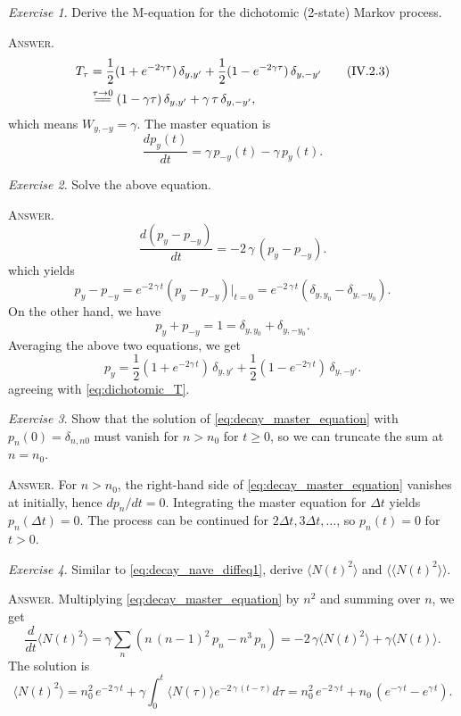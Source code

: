 \documentclass{book}
\numberwithin{equation}{section}
\theoremstyle{plain}
\theoremstyle{definition}
\theoremstyle{remark}
\newtheorem{exercise}{Exercise}
\newcommand{\answer}[1]{{\color{DarkBlue}\footnotesize \textsc{Answer.} #1}}
\begin{document}
\begin{exercise}
  Derive the M-equation for the dichotomic (2-state) Markov process.

  \answer{
  \begin{align}
  T_\tau
  &= \frac{1}{2}(1 + e^{-2\gamma \tau}) \, \delta_{y, y'}
  +\frac{1}{2}(1 - e^{-2\gamma \tau}) \, \delta_{y, -y'}
  \tag{IV.2.3}
  \label{eq:dichotomic_T}
  \\
  &\stackrel{\tau \to 0}{=\joinrel=}
  (1 - \gamma \tau) \, \delta_{y, y'} + \gamma \, \tau \, \delta_{y, -y'},
  \notag
  \end{align}
  which means $W_{y, -y} = \gamma$.
  The master equation is
  $$
  \frac{ d p_y(t) } { dt }
  = \gamma \, p_{-y}(t) - \gamma \, p_y(t).
  $$
  }
\end{exercise}


\begin{exercise}
  Solve the above equation.

  \answer{
  $$
  \frac{ d ( p_y - p_{-y} ) } { dt }
  = -2 \, \gamma \, (p_y - p_{-y} ).
  $$
  which yields
  $$
  p_y - p_{-y} = e^{-2 \, \gamma \, t} (p_y - p_{-y})\big|_{t = 0}
  = e^{-2\, \gamma \, t} (\delta_{y, y_0} - \delta_{y, -y_0}).
  $$
  On the other hand, we have
  $$
  p_y + p_{-y} = 1 = \delta_{y, y_0} + \delta_{y, -y_0}.
  $$
  Averaging the above two equations, we get
  $$
  p_y
  = \frac{1}{2}(1 + e^{-2\gamma \, t}) \, \delta_{y, y'}
  +\frac{1}{2}(1 - e^{-2\gamma \, t}) \, \delta_{y, -y'}.
  $$
  agreeing with \eqref{eq:dichotomic_T}.
  }
\end{exercise}

\begin{exercise}
  Show that the solution of \eqref{eq:decay_master_equation}
  with $p_n(0) = \delta_{n, n0}$
  must vanish for $n > n_0$ for $t \ge 0$,
  so we can truncate the sum at $n = n_0$.

  \answer{
  For $n > n_0$, the right-hand side of \eqref{eq:decay_master_equation}
  vanishes at initially, hence $dp_n/dt = 0$.
  Integrating the master equation for $\Delta t$ yields $p_n(\Delta t) = 0$.
  The process can be continued for $2 \Delta t, 3 \Delta t, \dots$,
  so $p_n(t) = 0$ for $t > 0$.
  }
\end{exercise}

\begin{exercise}
  Similar to \eqref{eq:decay_nave_diffeq1}, derive
  $\langle N(t)^2 \rangle$ and
  $\langle\langle N(t)^2 \rangle\rangle$.

  \answer{
    Multiplying \eqref{eq:decay_master_equation} by $n^2$
    and summing over $n$, we get
    $$
    \frac{ d } { d t } \langle N(t)^2 \rangle
    =
    \gamma \sum_{n} \left( n \, (n-1)^2 \, p_n - n^3 \, p_n \right)
    =
    - 2 \, \gamma \langle N(t)^2 \rangle
    + \gamma \langle N(t) \rangle.
    $$
    The solution is
    $$
    \langle N(t)^2 \rangle
    =
    n_0^2 \, e^{-2\,\gamma \, t}
    + \gamma \int_0^t \langle N(\tau)\rangle e^{-2\, \gamma \, (t - \tau)} d\tau
    =
    n_0^2 \, e^{-2\,\gamma \, t}
    +
    n_0 \, \left(e^{-\gamma \, t} - e^{\gamma \, t} \right).
    $$
  }
\end{exercise}
\end{document}
